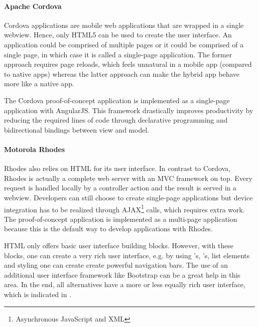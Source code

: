 \paragraph{Apache Cordova} Cordova applications are mobile web applications that are wrapped in a single webview. Hence, only HTML5 can be used to create the user interface. An application could be comprised of multiple pages or it could be comprised of a single page, in which case it is called  a single-page application. The former approach requires page reloads, which feels unnatural in a mobile app (compared to native apps) whereas the latter approach can make the hybrid app behave more like a native app. 

The Cordova proof-of-concept application is implemented as a single-page application with AngularJS. This framework drastically improves productivity by reducing the required lines of code through declarative programming and bidirectional bindings between view and model. 

\paragraph{Motorola Rhodes} Rhodes also relies on HTML for its user interface. In contrast to Cordova, Rhodes is actually a complete web server with an MVC framework on top. Every request is handled locally by a controller action and the result is served in a webview. Developers can still choose to create single-page applications but device integration has to be realized through AJAX\footnote{Asynchronous JavaScript and XML} calls, which requires extra work. The proof-of-concept application is implemented as a multi-page application because this is the default way to develop applications with Rhodes.

HTML only offers basic user interface building blocks. However, with these blocks, one can create a very rich user interface, e.g. by using 's, 's, list elements and styling one can create create powerful navigation bars. The use of an additional user interface framework like Bootstrap can be a great help in this area. In the end, all alternatives have a more or less equally rich user interface, which is indicated in .

